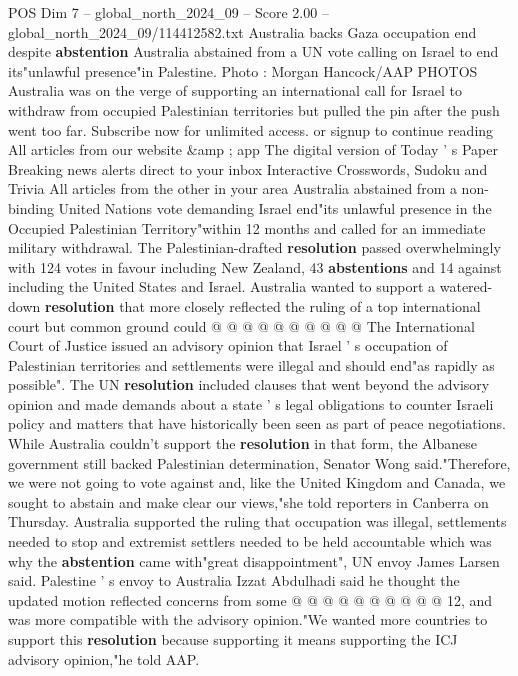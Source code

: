 \begin{textsample}{POS Dim 7 – global\_north\_2024\_09 – Score 2.00 – global\_north\_2024\_09/114412582.txt}  \label{ex:f7_pos_432}
Australia backs Gaza occupation end despite \textbf{abstention} Australia abstained from a UN vote calling on Israel to end its"unlawful presence"in Palestine.
Photo : Morgan Hancock/AAP PHOTOS Australia was on the verge of supporting an international call for Israel to withdraw from occupied Palestinian territories but pulled the pin after the push went too far.
Subscribe now for unlimited access. or signup to continue reading All articles from our website \&amp ; app The digital version of Today ' s Paper Breaking news alerts direct to your inbox Interactive Crosswords, Sudoku and Trivia All articles from the other in your area Australia abstained from a non-binding United Nations vote demanding Israel end"its unlawful presence in the Occupied Palestinian Territory"within 12 months and called for an immediate military withdrawal.
The Palestinian-drafted \textbf{resolution} passed overwhelmingly with 124 votes in favour including New Zealand, 43 \textbf{abstentions} and 14 against including the United States and Israel.
Australia wanted to support a watered-down \textbf{resolution} that more closely reflected the ruling of a top international court but common ground could @ @ @ @ @ @ @ @ @ @ The International Court of Justice issued an advisory opinion that Israel ' s occupation of Palestinian territories and settlements were illegal and should end"as rapidly as possible".
The UN \textbf{resolution} included clauses that went beyond the advisory opinion and made demands about a state ' s legal obligations to counter Israeli policy and matters that have historically been seen as part of peace negotiations.
While Australia couldn't support the \textbf{resolution} in that form, the Albanese government still backed Palestinian determination, Senator Wong said."Therefore, we were not going to vote against and, like the United Kingdom and Canada, we sought to abstain and make clear our views,"she told reporters in Canberra on Thursday.
Australia supported the ruling that occupation was illegal, settlements needed to stop and extremist settlers needed to be held accountable which was why the \textbf{abstention} came with"great disappointment", UN envoy James Larsen said.
Palestine ' s envoy to Australia Izzat Abdulhadi said he thought the updated motion reflected concerns from some @ @ @ @ @ @ @ @ @ @ 12, and was more compatible with the advisory opinion."We wanted more countries to support this \textbf{resolution} because supporting it means supporting the ICJ advisory opinion,"he told AAP.

\end{textsample}
